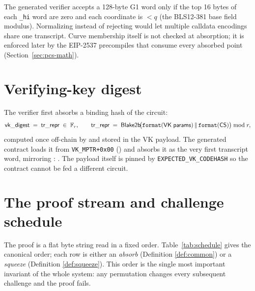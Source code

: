 \begin{definition}
\label{def:g1-canonical}
The generated verifier accepts a 128-byte G1 word only if the top 16 bytes
of each \texttt{\_\allowbreak{}hi} word are zero and each coordinate is $< q$ (the BLS12-381
base field modulus). Normalizing instead of rejecting would let multiple
calldata encodings share one transcript. Curve membership itself is not
checked at absorption; it is enforced later by the EIP-2537 precompiles that
consume every absorbed point (Section~\ref{sec:pcs-math}).
\end{definition}

\section{Verifying-key digest}
\label{sec:vk-digest}

The verifier first absorbs a binding hash of the circuit:
\begin{equation}
  \mathsf{vk\_\allowbreak{}digest} \;=\; \mathsf{tr\_\allowbreak{}repr} \;\in\; \mathbb{F}_r,
  \qquad
  \mathsf{tr\_\allowbreak{}repr} \;=\; \mathsf{Blake2b}\!\bigl(\texttt{format}(\mathsf{VK\;params})
  \,\|\, \texttt{format}(\mathsf{CS})\bigr) \bmod r,
  \label{eq:vk-digest}
\end{equation}
computed once off-chain by  and stored
in the VK payload. The generated contract loads it from
\texttt{VK\_\allowbreak{}MPTR+0x00} () and
absorbs it as the very first transcript word, mirroring
: . The payload itself is
pinned by \texttt{EXPECTED\_\allowbreak{}VK\_\allowbreak{}CODEHASH} so the contract cannot be fed a
different circuit.

\section{The proof stream and challenge schedule}
\label{sec:schedule}

The proof is a flat byte string read in a fixed order. Table~\ref{tab:schedule}
gives the canonical order; each row is either an \emph{absorb} (Definition
\ref{def:common}) or a \emph{squeeze} (Definition \ref{def:squeeze}).
This order is the single most important invariant of the whole system: any
permutation changes every subsequent challenge and the proof fails.

